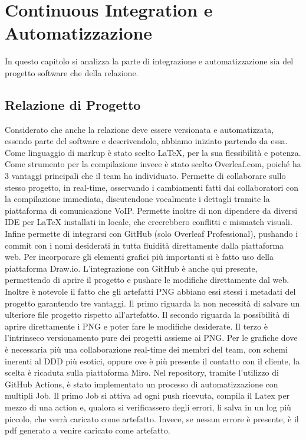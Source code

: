 \section{Continuous Integration e Automatizzazione}
\label{chap:CI}
In questo capitolo si analizza la parte di integrazione e automatizzazione sia del progetto software che della relazione. 
    \subsection{Relazione di Progetto}
        Considerato che anche la relazione deve essere versionata e automatizzata, essendo parte del software e descrivendolo, abbiamo iniziato partendo da essa. 
        Come linguaggio di markup è stato scelto {\LaTeX}, per la sua flessibilità e potenza. 
        Come strumento per la compilazione invece è stato scelto Overleaf.com, poiché ha 3 vantaggi principali che il team ha individuato. Permette di collaborare sullo stesso progetto, in real-time, osservando i cambiamenti fatti dai collaboratori con la compilazione immediata, discutendone vocalmente i dettagli tramite la piattaforma di comunicazione VoIP. Permette inoltre di non dipendere da diversi IDE per {\LaTeX} installati in locale, che creerebbero conflitti e mismatch visuali. Infine permette di integrarsi con GitHub (solo Overleaf Professional), pushando i commit con i nomi desiderati in tutta fluidità direttamente dalla piattaforma web.
        Per incorporare gli elementi grafici più importanti si è fatto uso della piattaforma Draw.io. L'integrazione con GitHub è anche qui presente, permettendo di aprire il progetto e pushare le modifiche direttamente dal web. Inoltre è notevole il fatto che gli artefatti PNG abbiano essi stessi i metadati del progetto garantendo tre vantaggi. Il primo riguarda la non necessità di salvare un ulteriore file progetto rispetto all'artefatto. Il secondo riguarda la possibilità di aprire direttamente i PNG e poter fare le modifiche desiderate. Il terzo è l'intrinseco versionamento pure dei progetti assieme ai PNG. 
        Per le grafiche dove è necessaria più una collaborazione real-time dei membri del team, con schemi inerenti al DDD più esotici, oppure ove è più presente il contatto con il cliente, la scelta è ricaduta sulla piattaforma Miro.
        Nel repository, tramite l'utilizzo di GitHub Actions, è stato implementato un processo di automatizzazione con multipli Job. 
        Il primo Job si attiva ad ogni push ricevuta, compila il Latex per mezzo di una action e, qualora si verificassero degli errori, li salva in un log più piccolo, che verrà caricato come artefatto. Invece, se nessun errore è presente, è il pdf generato a venire caricato come artefatto.
